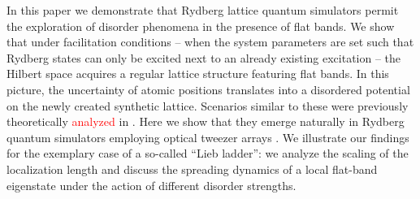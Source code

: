 \documentclass[prl,aps,twocolumn,showpacs,superscriptaddress,longbibliography]{revtex4-1}
\newcommand{\changer}[1]{\textcolor{red}{#1}}
\begin{document}
In this paper we demonstrate that Rydberg lattice quantum simulators \cite{Schauss_2015,Labuhn_2015,Bernien2017} permit the exploration of disorder phenomena in the presence of flat bands. We show that under facilitation conditions -- when the system parameters are set such that Rydberg states can only be excited next to an already existing excitation -- the Hilbert space acquires a regular lattice structure featuring flat bands. In this picture, the uncertainty of atomic positions translates into a disordered potential on the newly created synthetic lattice. Scenarios similar to these were previously theoretically \changer{analyzed} in \cite{Leykam2017, Bodyfelt2014}. Here we show that they emerge naturally in Rydberg quantum simulators employing optical tweezer arrays \cite{Labuhn_2015,Jau2016,Bernien2017}. We illustrate our findings for the exemplary case of a so-called ``Lieb ladder'': we analyze the scaling of the localization length and discuss the spreading dynamics of a local flat-band eigenstate under the action of different disorder strengths.
\end{document}
